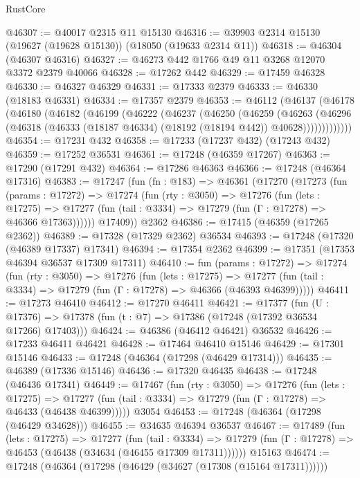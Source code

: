 \begin{lexlean}{RustCore}
\begin{coremodule}
@46307 := @40017 @2315 @11 @15130
@46316 := @39903 @2314 @15130 (@19627 (@19628 @15130)) (@18050 (@19633 @2314 @11))
@46318 := @46304 (@46307 @46316)
@46327 := @46273 @442 @1766 @49 @11 @3268 @12070 @3372 @2379 @40066
@46328 := @17262 @442
@46329 := @17459 @46328
@46330 := @46327 @46329
@46331 := @17333 @2379
@46333 := @46330 (@18183 @46331)
@46334 := @17357 @2379
@46353 := @46112
    (@46137
      (@46178
        (@46180
          (@46182
            (@46199
              (@46222
                (@46237
                  (@46250
                    (@46259
                      (@46263
                        (@46296
                          (@46318 (@46333 (@18187 @46334) (@18192 (@18194 @442)) @40628)))))))))))))
@46354 := @17231 @432
@46358 := @17233 (@17237 @432) (@17243 @432)
@46359 := @17252 @36531
@46361 := @17248 (@46359 @17267)
@46363 := @17290 (@17291 @432)
@46364 := @17286 @46363
@46366 := @17248 (@46364 @17316)
@46383 := @17247
    (fun (fn : @183) =>
    @46361
      (@17270
        (@17273
          (fun (params : @17272) =>
          @17274
            (fun (rty : @3050) =>
            @17276
              (fun (lets : @17275) =>
              @17277 (fun (tail : @3334) => @17279 (fun (Γ : @17278) => @46366 @17363))))))
        @17409))
    @2362
@46386 := @17415 (@46359 (@17265 @2362))
@46389 := @17328 (@17329 @2362) @36534
@46393 := @17248 (@17320 (@46389 @17337) @17341)
@46394 := @17354 @2362
@46399 := @17351 (@17353 @46394 @36537 @17309 @17311)
@46410 := fun (params : @17272) =>
  @17274
    (fun (rty : @3050) =>
    @17276
      (fun (lets : @17275) =>
      @17277 (fun (tail : @3334) => @17279 (fun (Γ : @17278) => @46366 (@46393 @46399)))))
@46411 := @17273 @46410
@46412 := @17270 @46411
@46421 := @17377
    (fun (U : @17376) => @17378 (fun (t : @7) => @17386 (@17248 (@17392 @36534 @17266) @17403)))
@46424 := @46386 (@46412 @46421) @36532
@46426 := @17233 @46411 @46421
@46428 := @17464 @46410 @15146
@46429 := @17301 @15146
@46433 := @17248 (@46364 (@17298 (@46429 @17314)))
@46435 := @46389 (@17336 @15146)
@46436 := @17320 @46435
@46438 := @17248 (@46436 @17341)
@46449 := @17467
    (fun (rty : @3050) =>
    @17276
      (fun (lets : @17275) =>
      @17277 (fun (tail : @3334) => @17279 (fun (Γ : @17278) => @46433 (@46438 @46399)))))
    @3054
@46453 := @17248 (@46364 (@17298 (@46429 @34628)))
@46455 := @34635 @46394 @36537
@46467 := @17489
    (fun (lets : @17275) =>
    @17277
      (fun (tail : @3334) =>
      @17279 (fun (Γ : @17278) => @46453 (@46438 (@34634 (@46455 @17309 @17311))))))
    @15163
@46474 := @17248 (@46364 (@17298 (@46429 (@34627 (@17308 (@15164 @17311))))))

\end{coremodule}
\end{lexlean}
